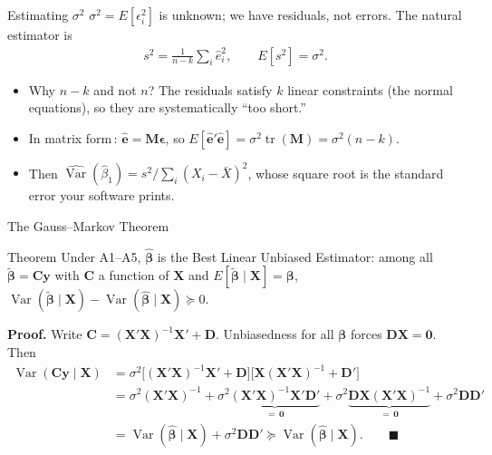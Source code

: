 \documentclass[aspectratio=169,11pt,xcolor=dvipsnames]{beamer}
\DeclareMathOperator{\Var}{Var}
\DeclareMathOperator{\trace}{tr}
\newcommand{\E}{E}
\newcommand{\X}{\bm{X}}
\newcommand{\Y}{\bm{y}}
\newcommand{\zero}{\bm{0}}
\newcommand{\Mm}{\bm{M}}
\newcommand{\bhat}{\hat{\bm{\beta}}}
\newcommand{\ehat}{\hat{\bm{e}}}
\newcommand{\adv}{\,\raisebox{0.6pt}{\textcolor{accent}{$\bigstar$}}}
\begin{document}
\begin{frame}{Estimating $\sigma^2$}
$\sigma^2 = \E[\epsilon_i^2]$ is unknown; we have residuals, not errors. The
natural estimator is
\begin{align*}
  s^2 = \frac{1}{n-k}\sum_i \hat e_i^2 ,
  \qquad \E[s^2] = \sigma^2 .
\end{align*}
\begin{itemize}\itemsep3pt
  \item Why $n-k$ and not $n$? The residuals satisfy $k$ linear constraints
        (the normal equations), so they are systematically ``too short.''
  \item In matrix form\adv: $\ehat = \Mm\bm\epsilon$, so
        $\E[\ehat'\ehat] = \sigma^2\trace(\Mm) = \sigma^2(n-k)$.
  \item Then $\widehat{\Var}(\hat\beta_1) = s^2/\sum_i (X_i-\bar X)^2$, whose
        square root is the standard error your software prints.
\end{itemize}
\end{frame}

\begin{frame}{The Gauss--Markov Theorem\adv}
\begin{block}{Theorem}
Under A1--A5, $\bhat$ is the \alert{Best Linear Unbiased Estimator}: among all
$\tilde{\bm\beta} = \bm{C}\Y$ with $\bm C$ a function of $\X$ and
$\E[\tilde{\bm\beta}\mid\X]=\bm\beta$,
$\Var(\tilde{\bm\beta}\mid\X) - \Var(\bhat\mid\X) \succeq 0$.
\end{block}
\pause
\textbf{Proof.} Write $\bm{C} = (\X'\X)^{-1}\X' + \bm{D}$. Unbiasedness for all
$\bm\beta$ forces $\bm{D}\X = \zero$. Then
\begin{align*}
  \Var(\bm C\Y\mid\X)
  &= \sigma^2\big[(\X'\X)^{-1}\X' + \bm D\big]\big[\X(\X'\X)^{-1} + \bm D'\big] \\
  &= \sigma^2(\X'\X)^{-1}
   + \sigma^2\underbrace{(\X'\X)^{-1}\X'\bm D'}_{=\,\zero}
   + \sigma^2\underbrace{\bm D\X(\X'\X)^{-1}}_{=\,\zero}
   + \sigma^2\bm{D}\bm{D}' \\
  &= \Var(\bhat\mid\X) + \sigma^2\bm{D}\bm{D}' \succeq \Var(\bhat\mid\X) .
  \qquad\blacksquare
\end{align*}
\end{frame}
\end{document}
